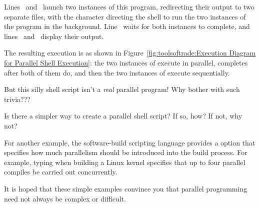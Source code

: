 \begin{lineref}
Lines~ and~ launch two instances of this
program, redirecting their
output to two separate files, with the \co{&} character directing the
shell to run the two instances of the program in the background.
Line~ waits for both instances to complete, and
lines~ and~
display their output.
\end{lineref}
The resulting execution is as shown in
Figure~\ref{fig:toolsoftrade:Execution Diagram for Parallel Shell Execution}:
the two instances of  execute in parallel,
 completes after both of them do, and then the two instances
of  execute sequentially.

\QuickQuiz{}
	But this silly shell script isn't a \emph{real} parallel program!
	Why bother with such trivia???
 \QuickQuizEnd

\QuickQuiz{}
	Is there a simpler way to create a parallel shell script?
	If so, how?  If not, why not?
 \QuickQuizEnd

For another example, the  software-build scripting language
provides a  option that specifies how much parallelism should be
introduced into the build process.
For example, typing  when building a Linux kernel
specifies that up to four parallel compiles be carried out concurrently.

It is hoped that these simple examples convince you that parallel
programming need not always be complex or difficult.

